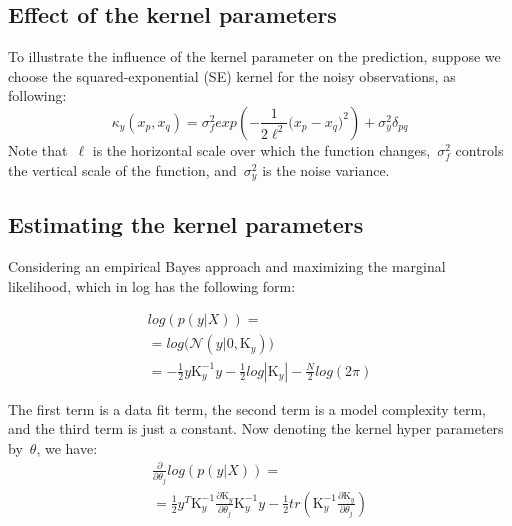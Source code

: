 \documentclass[]{IEEEtran}
\begin{document}
\subsection{Effect of the kernel parameters }
To illustrate the influence of the kernel parameter on the prediction, suppose we choose the  squared-exponential (SE) kernel for the noisy observations, as following:
\begin{equation}
{ \kappa  }_{ y }({ x }_{ p },{ x }_{ q })={ \sigma  }_{ f }^{ 2 }exp(-\frac { 1 }{ 2{ \ell  }^{ 2 } } { { ({ x }_{ p }-{ x }_{ q } }) }^{ 2 })+{ \sigma  }_{ y }^{ 2 }{ \delta  }_{ pq }
\label{M15p19}
\end{equation}
Note that~\(\ell\) is the horizontal scale over which the function changes,~\({ \sigma  }_{ f }^{ 2 }\) controls the vertical scale of the function, and~\({ \sigma  }_{ y }^{ 2 }\) is the noise variance.
\subsection{Estimating the kernel parameters   }
Considering an empirical Bayes approach and  maximizing the marginal likelihood, which in log has the following form:

\begin{multline}
log(p(y|{ X }))= \\
={ log(\mathcal{N} }(y|0,{ \mathrm{K} }_{ y })) \\
=-\frac { 1 }{ 2 } y{ \mathrm{K} }_{ y }^{ -1 }y-\frac { 1 }{ 2 } log\left| { \mathrm{K} }_{ y } \right| -\frac { N }{ 2 } log(2\pi )
\label{M15p22}
\end{multline}

The ﬁrst term is a data ﬁt term, the second term is a model complexity term, and the third term is just a constant. Now denoting the kernel hyper parameters by~\(\theta \), we have: 
\begin{multline}
\frac { \partial  }{ { \partial \theta  }_{ j } } log(p(y|{ X }))= \\
=\frac { 1 }{ 2 } { y }^{ T }{ { \mathrm{K} } }_{ y }^{ -1 }\frac { \partial { \mathrm{K} }_{ y } }{ { \partial \theta  }_{ j } } { { \mathrm{K} } }_{ y }^{ -1 }y-\frac { 1 }{ 2 } tr({ { \mathrm{K} } }_{ y }^{ -1 }\frac { \partial { \mathrm{K} }_{ y } }{ { \partial \theta  }_{ j } } )
\label{M15p23}
\end{multline}
\end{document}
